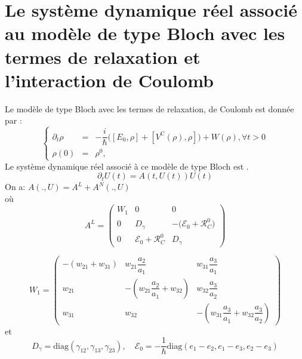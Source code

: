 \documentclass[a4paper,12pt]{article} %
\begin{document}
\section{Le système dynamique réel associé au modèle de type Bloch avec les termes de relaxation et l'interaction de Coulomb}

Le modèle de type Bloch avec les termes de relaxation, de Coulomb est donnée par :
\begin{equation}\label{modèle de base}
\left\{
   \begin{array}{rcl}
   
   \partial_{t}\rho & = & -\dfrac{i}{\hbar}\Big([E_{0},\rho]+[V^{\textrm{C}}(\rho),\rho]\Big)+ W(\rho), \forall t>0 \\
   \rho(0)          & = & \rho^{0},
   
   \end{array}
 \right.
\end{equation}
Le système dynamique réel associé à ce modèle de type Bloch est .
\begin{equation}\label{equation du systeme dynamique reel non lineaire}
\partial_{t}U(t) = A(t,U(t))U(t) 
\end{equation}
On a: $ A(.,U)= A^{L}+ A^{N}(.,U)$ \\
où 
\begin{equation}
A^{L}=
\begin{pmatrix}
W_{1} &      0                    & 0                       \\
    0 & D_{\gamma}                &  -\big(\mathcal{E}_{0}+\mathcal{R}^{0}_{C}\big)  \\
    0 & \mathcal{E}_{0}+ \mathcal{R}^{0}_{C}  &  D_{\gamma}
\end{pmatrix}\label{matrice Al}
\end{equation}

$$
 W_{1}= 
\begin{pmatrix}
-(w_{21} + w_{31}) & w_{21}\dfrac{a_{2}}{a_{1}} & w_{31}\dfrac{a_{3}}{a_{1}}\\
            w_{21} & -(w_{21}\dfrac{a_{2}}{a_{1}} + w_{32}) & w_{32}\dfrac{a_{3}}{a_{2}}\\
            w_{31} &                                 w_{32} & -(w_{31}\dfrac{a_{3}}{a_{1}} + w_{32}\dfrac{a_{3}}{a_{2}})
\end{pmatrix}
$$
et 
$$ D_{\gamma} = \textrm{diag}(\gamma_{12},\gamma_{13}, \gamma_{23}), \quad \mathcal{E}_{0} = - \dfrac{1}{\hbar}  \textrm{diag}(e_{1}-e_{2},e_{1}-e_{3}, e_{2}-e_{3}) $$
\end{document}
